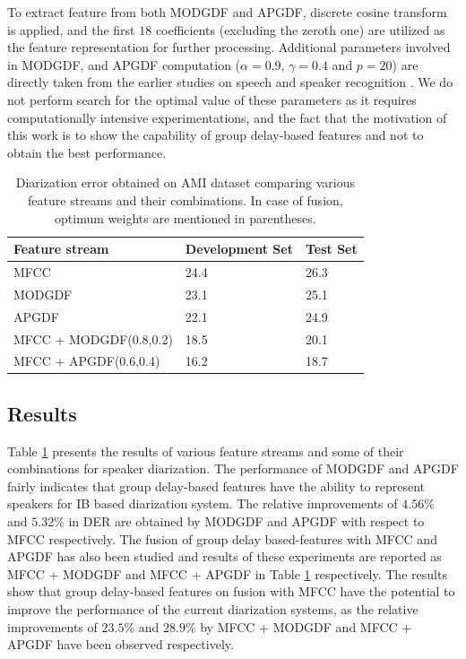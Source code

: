 \documentclass[conference]{IEEEtran}
\begin{document}
To extract feature from both MODGDF and APGDF, discrete cosine transform is applied, and the first $18$ coefficients (excluding the zeroth one) are utilized as the feature representation for further processing. Additional parameters involved in MODGDF, and APGDF computation ($\alpha =
0.9$, $\gamma=0.4$ and $p=20$) are directly taken from the earlier studies on speech
and speaker recognition \cite{modifiedGD,allPoleGdSid}. We do not perform search for the optimal value of these parameters as it requires computationally intensive experimentations, and the fact that the motivation of this work is to show the capability of group delay-based features and not to obtain the best performance. 

\begin{table}[h]
\centering
\label{my-label}
\begin{tabular}{|l|l|l|}
\hline
Feature stream  & Development Set & Test Set \\ \hline
MFCC          & 24.4                   & 26.3            \\ \hline
MODGDF        & 23.1                   & 25.1            \\ \hline
APGDF         & 22.1                   & 24.9            \\ \hline
MFCC + MODGDF(0.8,0.2) & 18.5          & 20.1            \\ \hline
MFCC + APGDF(0.6,0.4)  & 16.2          & 18.7            \\ \hline
\end{tabular}
\vspace{0.4cm}
\label{table:results}
\caption{Diarization error obtained on AMI dataset comparing various feature
streams and their combinations. In case of fusion, optimum weights are mentioned
in parentheses.}
\end{table}


\subsection{Results}

Table \ref{table:results} presents the results of various feature streams and some of their
combinations for speaker diarization. The performance of MODGDF and APGDF
fairly indicates that group delay-based features have the ability to represent
speakers for IB based diarization system. The relative improvements
of $4.56\%$ and $5.32\%$ in DER are obtained by MODGDF and APGDF with respect to MFCC
respectively. The fusion of group delay based-features with MFCC and APGDF has also been
studied and results of these experiments are reported as MFCC + MODGDF and MFCC + APGDF in Table \ref{table:results} respectively. The results show that group delay-based features on fusion with MFCC have the potential to improve the performance of the current diarization systems, as the relative improvements of $23.5\%$ and $28.9\%$ by MFCC + MODGDF and MFCC + APGDF have been observed respectively.
\end{document}
